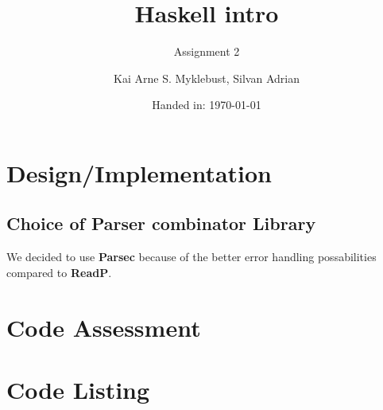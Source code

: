 \documentclass[12pt,a4paper]{article}
\begin{document}
\title{Haskell intro}
\subtitle{Assignment 2}

\author{Kai Arne S. Myklebust, Silvan Adrian}
\date{Handed in: \today}
	
\maketitle
\tableofcontents

\section{Design/Implementation}


\subsection{Choice of Parser combinator Library}
We decided to use \textbf{Parsec} because of the better error handling possabilities compared to \textbf{ReadP}.

\section{Code Assessment}

\appendix
\section{Code Listing}

\inputminted{haskell}{handin/src/SubsInterpreter.hs}
\end{document}
